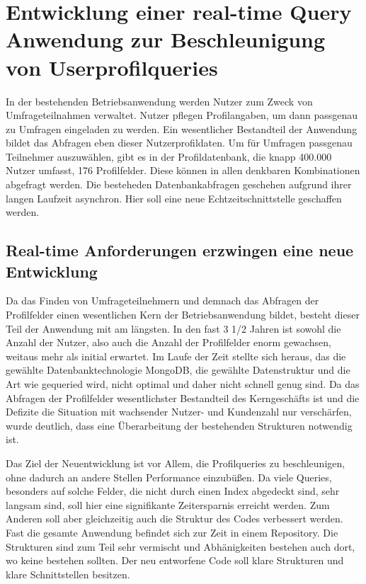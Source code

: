 \chapter{Entwicklung einer real-time Query Anwendung zur Beschleunigung von Userprofilqueries}
In der bestehenden Betriebsanwendung werden Nutzer zum Zweck von Umfrageteilnahmen verwaltet. Nutzer pflegen Profilangaben, um dann passgenau zu Umfragen eingeladen zu werden.
Ein wesentlicher Bestandteil der Anwendung bildet das Abfragen eben dieser Nutzerprofildaten. Um für Umfragen passgenau Teilnehmer auszuwählen, gibt es in der Profildatenbank, die knapp 400.000 Nutzer umfasst, 176 Profilfelder. Diese können in allen denkbaren Kombinationen abgefragt werden. Die besteheden Datenbankabfragen geschehen aufgrund ihrer langen Laufzeit asynchron. Hier soll eine neue Echtzeitschnittstelle geschaffen werden.

\section{Real-time Anforderungen erzwingen eine neue Entwicklung}
Da das Finden von Umfrageteilnehmern und demnach das Abfragen der Profilfelder einen wesentlichen Kern der Betriebsanwendung bildet, besteht dieser Teil der Anwendung mit am längsten. In den fast 3 1/2 Jahren ist sowohl die Anzahl der Nutzer, also auch die Anzahl der Profilfelder enorm gewachsen, weitaus mehr als initial erwartet. Im Laufe der Zeit stellte sich heraus, das die gewählte Datenbanktechnologie MongoDB, die gewählte Datenstruktur und die Art wie gequeried wird, nicht optimal und daher nicht schnell genug sind. Da das Abfragen der Profilfelder wesentlichster Bestandteil des Kerngeschäfts ist und die Defizite die Situation mit wachsender Nutzer- und Kundenzahl nur verschärfen, wurde deutlich, dass eine Überarbeitung der bestehenden Strukturen notwendig ist.

Das Ziel der Neuentwicklung ist vor Allem, die Profilqueries zu beschleunigen, ohne dadurch an andere Stellen Performance einzubüßen. Da viele Queries, besonders auf solche Felder, die nicht durch einen Index abgedeckt sind, sehr langsam sind, soll hier eine signifikante Zeitersparnis erreicht werden. Zum Anderen soll aber gleichzeitig auch die Struktur des Codes verbessert werden. Fast die gesamte Anwendung befindet sich zur Zeit in einem Repository. Die Strukturen sind zum Teil sehr vermischt und Abhänigkeiten bestehen auch dort, wo keine bestehen sollten. Der neu entworfene Code soll klare Strukturen und klare Schnittstellen besitzen.

